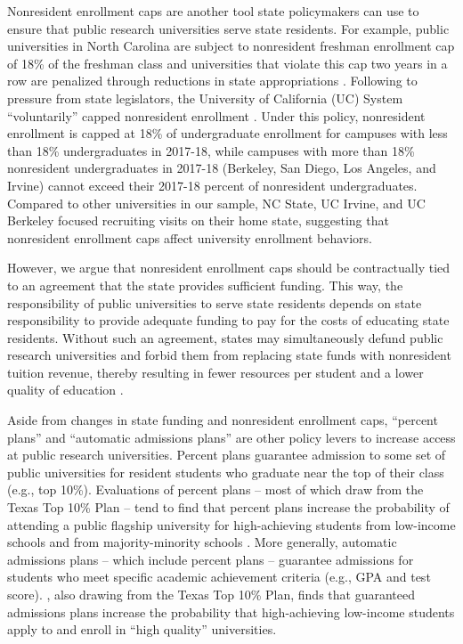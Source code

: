 \documentclass[twoside]{article}
\begin{document}
Nonresident enrollment caps are another tool state policymakers can use to ensure that public research universities serve state residents.  For example, public universities in North Carolina are subject to nonresident freshman enrollment cap of 18\% of the freshman class and universities that violate this cap two years in a row are penalized through reductions in state appropriations \citep{RN4424}. Following to pressure from state legislators, the  University of California (UC) System ``voluntarily'' capped nonresident enrollment \citep{RN4433}. Under this policy, nonresident enrollment is capped at 18\% of undergraduate enrollment for campuses with less than 18\% undergraduates in 2017-18, while campuses with more than 18\% nonresident undergraduates in 2017-18 (Berkeley, San Diego, Los Angeles, and Irvine) cannot exceed their 2017-18 percent of nonresident undergraduates.  Compared to other universities in our sample, NC State, UC Irvine, and UC Berkeley focused recruiting visits on their home state, suggesting that nonresident enrollment caps affect university enrollment behaviors.

However, we argue that nonresident enrollment caps should be contractually tied to an agreement that the state provides sufficient funding. This way, the responsibility of public universities to serve state residents depends on state responsibility to provide adequate funding to pay for the costs of educating state residents.  Without such an agreement, states may simultaneously defund public research universities and forbid them from replacing state funds with nonresident tuition revenue, thereby resulting in fewer resources per student and a lower quality of education \citep{RN532}.

Aside from changes in state funding and nonresident enrollment caps, ``percent plans'' and ``automatic admissions plans'' are other policy levers to increase access at public research universities.  Percent plans guarantee admission to some set of public universities for resident students who graduate near the top of their class (e.g., top 10\%).  Evaluations of percent plans -- most of which draw from the Texas Top 10\% Plan -- tend to find that percent plans increase the probability of attending a public flagship university for high-achieving students from low-income schools and from majority-minority schools \citep{RN4434,RN4435,RN4437,RN4436}.  More generally, automatic admissions plans -- which include percent plans -- guarantee admissions for students who meet specific academic achievement criteria (e.g., GPA and test score).  \cite{RN4428}, also drawing from the Texas Top 10\% Plan, finds that guaranteed admissions plans increase the probability that high-achieving low-income students apply to and enroll in ``high quality'' universities.
\end{document}
